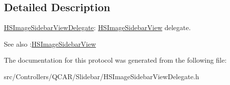 \subsection{\-Detailed \-Description}
\hyperlink{protocol_h_s_image_sidebar_view_delegate-p}{\-H\-S\-Image\-Sidebar\-View\-Delegate}\-: \hyperlink{interface_h_s_image_sidebar_view}{\-H\-S\-Image\-Sidebar\-View} delegate. 

\begin{DoxySeeAlso}{\-See also}
\-:\hyperlink{interface_h_s_image_sidebar_view}{\-H\-S\-Image\-Sidebar\-View} 
\end{DoxySeeAlso}


\-The documentation for this protocol was generated from the following file\-:\begin{DoxyCompactItemize}
\item 
src/\-Controllers/\-Q\-C\-A\-R/\-Slidebar/\-H\-S\-Image\-Sidebar\-View\-Delegate.\-h\end{DoxyCompactItemize}
